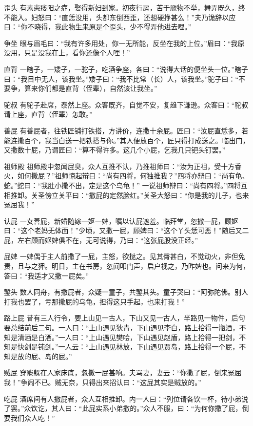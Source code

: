\documentclass[12pt,UTF8]{ctexbook}
\begin{document}
歪头
有素患痿阳之症，娶得新妇到家。初夜行房，苦于厥物不举，舞弄既久，终不能入。妇怒曰：“直恁没用，头都东倒西歪，还想硬挣甚么！”夫乃诡辞以应曰：“你不晓得，我此物生来原是个歪头，少不得弄他进去哩。”

争坐
眼与眉毛曰：“我有许多用处，你一无所能，反坐在我的上位。”眉曰：“我原没用，只是没我在上，看你还像个人哩！”

直背
一瞎子，一矮子，一驼子，吃酒争座，各曰：“说得大话的便坐头一位。”瞎子曰：“我目中无人，该我坐。”矮子曰：“我不比常（长）人，该我坐。”驼子曰：“不要争，算来你们都是直背（侄辈），自然该让我坐。”

驼叔
有驼子赴席，泰然上座。众客既齐，自觉不安，复趋下谦逊。众客曰：“驼叔请上座，直背（侄辈）怎敢。”

善屁
有善屁者，往铁匠铺打铁搭，方讲价，连撒十余屁。匠曰：“汝屁直恁多，若能连撒百个，我当白送一把铁搭与你。”其人便放百个，匠只得打成送之。临出门，又撒数十屁，乃谓匠曰：“算不得许多。这几个小屁，乞我几只钯头钉罢。”

祖师殿
祖师殿中忽闻屁臭，众人互推不认，乃推祖师曰：“汝为正祖，受十方香火，如何撒屁？”祖师惊起辩曰：“尚有四将，何独推我？”四将亦辩曰：“尚有龟、蛇。”蛇曰：“我肚小撒不出，定是这个乌龟！”
一说祖师辩曰：“尚有四将。”四将互相推卸。关圣傍立关平曰：“撒屁的定然脸红。”关圣大怒曰：“你是我的儿子，也来冤屈我！”

认屁
一女善屁，新婚随嫁一妪一婢，嘱以认屁遮羞。临拜堂，忽撒一屁，顾妪曰：“这个老妈无体面！”少顷，又撒一屁，顾婢曰：“这个丫头恁可恶！”随后又二屁，左右顾而妪婢俱不在，无可说得，乃曰：“这张屁股没正经。”

屁婢
一婢偶于主人前撒了一屁，主怒，欲挞之。见其臀甚白，不觉动火，非但免责，且与之狎。明日，主在书房，忽闻叩门声，启户视之，乃昨婢也。问来为何，答曰：“我适才又撒一屁矣。”

錾头
数人同舟，有撒屁者，众疑一童子，共錾其头。童子哭曰：“阿弥陀佛。别人打我也罢了，亏那撒屁的乌龟，担得这只手起，也来打我！”

路上屁
昔有三人行令，要上山见一古人，下山又见一古人，半路见一物件，后句要总结前后二句。一人曰：“上山遇见狄青，下山遇见李白，路上拾得一瓶酒，不知是清酒是白酒。”一人曰：“上山遇见樊哙，下山遇见赵盾，路上拾得一把剑，不知是快剑是钝剑。”一人云：“上山遇见林放，下山遇见贾岛，路上拾得一个屁，不知是放的屁、岛的屁。”

贼屁
穿窬躲在人家床底，忽撒一屁甚响。夫骂妻，妻云：“你撒了屁，倒来冤屈我！”争闹不已。贼无奈，只得出来招认曰：“这屁其实是贼放的。”

吃屁
酒席间有人撒屁者，众人互相推卸。内一人曰：“列位请各饮一杯，待小弟说了罢。”众饮讫，其人曰：“此屁实系小弟撒的。”众人不服，曰：“为何你撒了屁，倒要我们众人吃！”
\end{document}
